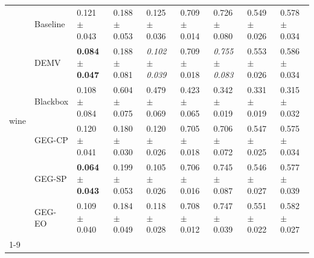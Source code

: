 \begin{table}
\begin{tabular}{lllllllll}
\multirow[t]{6}{*}{wine} & Baseline & 0.121 $\pm$ 0.043 & 0.188 $\pm$ 0.053 & 0.125 $\pm$ 0.036 & 0.709 $\pm$ 0.014 & 0.726 $\pm$ 0.080 & 0.549 $\pm$ 0.026 & 0.578 $\pm$ 0.034 \\
 & DEMV & \textbf{0.084 $\pm$ 0.047} & 0.188 $\pm$ 0.081 & \textit{0.102 $\pm$ 0.039} & 0.709 $\pm$ 0.018 & \textit{0.755 $\pm$ 0.083} & 0.553 $\pm$ 0.026 & 0.586 $\pm$ 0.034 \\
 & Blackbox & 0.108 $\pm$ 0.084 & 0.604 $\pm$ 0.075 & 0.479 $\pm$ 0.069 & 0.423 $\pm$ 0.065 & 0.342 $\pm$ 0.019 & 0.331 $\pm$ 0.019 & 0.315 $\pm$ 0.032 \\
 & GEG-CP & 0.120 $\pm$ 0.041 & 0.180 $\pm$ 0.030 & 0.120 $\pm$ 0.026 & 0.705 $\pm$ 0.018 & 0.706 $\pm$ 0.072 & 0.547 $\pm$ 0.025 & 0.575 $\pm$ 0.034 \\
 & GEG-SP & \textbf{0.064 $\pm$ 0.043} & 0.199 $\pm$ 0.053 & 0.105 $\pm$ 0.026 & 0.706 $\pm$ 0.016 & 0.745 $\pm$ 0.087 & 0.546 $\pm$ 0.027 & 0.577 $\pm$ 0.039 \\
 & GEG-EO & 0.109 $\pm$ 0.040 & 0.184 $\pm$ 0.049 & 0.118 $\pm$ 0.028 & 0.708 $\pm$ 0.012 & 0.747 $\pm$ 0.039 & 0.551 $\pm$ 0.022 & 0.582 $\pm$ 0.027 \\
\cline{1-9}
\bottomrule
\end{tabular}
\end{table}
